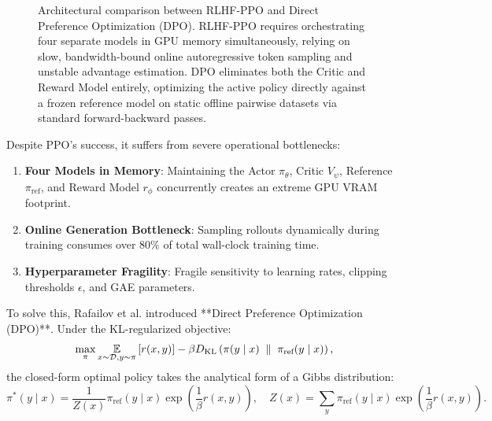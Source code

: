 \documentclass[../../../main.tex]{subfiles}
\begin{document}
\begin{figure}[t]
\caption{Architectural comparison between RLHF-PPO and Direct Preference Optimization (DPO). RLHF-PPO requires orchestrating four separate models in GPU memory simultaneously, relying on slow, bandwidth-bound online autoregressive token sampling and unstable advantage estimation. DPO eliminates both the Critic and Reward Model entirely, optimizing the active policy directly against a frozen reference model on static offline pairwise datasets via standard forward-backward passes.}
\label{fig:ppo_vs_dpo_architecture}
\end{figure}

Despite PPO's success, it suffers from severe operational bottlenecks:
\begin{enumerate}
    \item \textbf{Four Models in Memory}: Maintaining the Actor $\pi_\theta$, Critic $V_\psi$, Reference $\pi_{\text{ref}}$, and Reward Model $r_\phi$ concurrently creates an extreme GPU VRAM footprint.
    \item \textbf{Online Generation Bottleneck}: Sampling rollouts dynamically during training consumes over $80\%$ of total wall-clock training time.
    \item \textbf{Hyperparameter Fragility}: Fragile sensitivity to learning rates, clipping thresholds $\epsilon$, and GAE parameters.
\end{enumerate}

To solve this, Rafailov et al. \citep{rafailov2023} introduced **Direct Preference Optimization (DPO)**. Under the KL-regularized objective:
\begin{equation}
\max_\pi \operatorname*{\mathbb{E}}_{x \sim \mathcal{D}, y \sim \pi} \left[ r(x, y) \right] - \beta D_{\mathrm{KL}}\left(\pi(y \mid x) \;\parallel\; \pi_{\text{ref}}(y \mid x)\right),
\end{equation}
the closed-form optimal policy takes the analytical form of a Gibbs distribution:
\begin{equation}
\label{eq:gibbs_optimal_policy}
\pi^*(y \mid x) = \frac{1}{Z(x)} \pi_{\text{ref}}(y \mid x) \exp\left( \frac{1}{\beta} r(x, y) \right), \quad Z(x) = \sum_y \pi_{\text{ref}}(y \mid x) \exp\left( \frac{1}{\beta} r(x, y) \right).
\end{equation}
\end{document}

